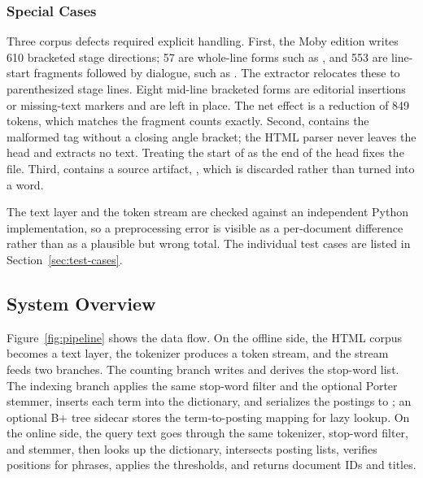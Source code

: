 \subsubsection{Special Cases}
\label{sec:preprocess-analysis}

Three corpus defects required explicit handling. First, the Moby edition writes
610 bracketed stage directions; 57 are whole-line forms such as
\code{[Sings]}, and 553 are line-start fragments followed by dialogue, such as
. The extractor relocates these to
parenthesized stage lines. Eight mid-line bracketed forms are editorial
insertions or missing-text markers and are left in place. The net effect is a
reduction of 849 tokens, which matches the fragment counts exactly. Second,
 contains the malformed tag  without a
closing angle bracket; the HTML parser never leaves the head and extracts no
text. Treating the start of  as the end of the head fixes the
file. Third,  contains a source artifact,
, which is discarded rather than turned into a word.

The text layer and the token stream are checked against an independent Python
implementation, so a preprocessing error is visible as a per-document
difference rather than as a plausible but wrong total. The individual test
cases are listed in Section~\ref{sec:test-cases}.

\subsection{System Overview}
\label{sec:architecture}

Figure~\ref{fig:pipeline} shows the data flow. On the offline side, the HTML
corpus becomes a text layer, the tokenizer produces a token stream, and the
stream feeds two branches. The counting branch writes  and
derives the stop-word list. The indexing branch applies the same stop-word
filter and the optional Porter stemmer, inserts each term into the dictionary,
and serializes the postings to ; an optional B+ tree sidecar
stores the term-to-posting mapping for lazy lookup. On the online side, the
query text goes through the same tokenizer, stop-word filter, and stemmer, then
looks up the dictionary, intersects posting lists, verifies positions for
phrases, applies the thresholds, and returns document IDs and titles.



